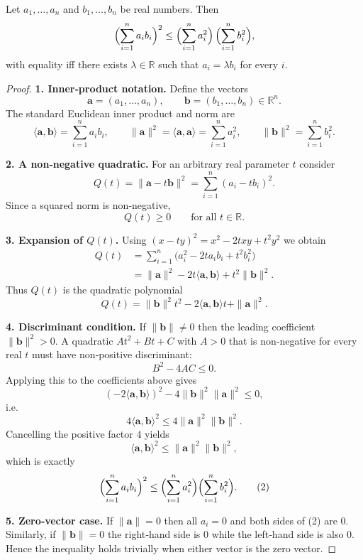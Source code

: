 \begin{theorem}
Let $a_{1},\dots ,a_{n}$ and $b_{1},\dots ,b_{n}$ be real numbers. Then
\[
\Bigl(\sum_{i=1}^{n} a_i b_i\Bigr)^{2}\le
\Bigl(\sum_{i=1}^{n} a_i^{2}\Bigr)\,
\Bigl(\sum_{i=1}^{n} b_i^{2}\Bigr),
\]
with equality iff there exists $\lambda\in\mathbb R$ such that $a_i=\lambda b_i$ for every $i$.
\end{theorem}

\begin{proof}
\textbf{1. Inner‑product notation.}  
Define the vectors
\[
\mathbf a=(a_{1},\dots ,a_{n}),\qquad 
\mathbf b=(b_{1},\dots ,b_{n})\in\mathbb R^{n}.
\]
The standard Euclidean inner product and norm are
\[
\langle\mathbf a,\mathbf b\rangle =\sum_{i=1}^{n}a_i b_i,\qquad
\|\mathbf a\|^{2}= \langle\mathbf a,\mathbf a\rangle =\sum_{i=1}^{n}a_i^{2},\qquad
\|\mathbf b\|^{2}= \sum_{i=1}^{n}b_i^{2}.
\]

\textbf{2. A non‑negative quadratic.}  
For an arbitrary real parameter $t$ consider
\[
Q(t)=\|\mathbf a-t\mathbf b\|^{2}= \sum_{i=1}^{n}(a_i-t b_i)^{2}.
\]
Since a squared norm is non‑negative,
\[
Q(t)\ge 0\qquad\text{for all }t\in\mathbb R. \tag{1}
\]

\textbf{3. Expansion of $Q(t)$.}  
Using $(x-ty)^{2}=x^{2}-2txy+t^{2}y^{2}$ we obtain
\begin{align*}
Q(t)
&=\sum_{i=1}^{n}\bigl(a_i^{2}-2t a_i b_i+t^{2}b_i^{2}\bigr)\\
&=\|\mathbf a\|^{2}-2t\langle\mathbf a,\mathbf b\rangle+t^{2}\|\mathbf b\|^{2}.
\end{align*}
Thus $Q(t)$ is the quadratic polynomial
\[
Q(t)=\|\mathbf b\|^{2}t^{2}-2\langle\mathbf a,\mathbf b\rangle t+\|\mathbf a\|^{2}.
\]

\textbf{4. Discriminant condition.}  
If $\|\mathbf b\|\neq0$ then the leading coefficient $\|\mathbf b\|^{2}>0$.  
A quadratic $At^{2}+Bt+C$ with $A>0$ that is non‑negative for every real $t$ must have non‑positive discriminant:
\[
B^{2}-4AC\le0.
\]
Applying this to the coefficients above gives
\[
(-2\langle\mathbf a,\mathbf b\rangle)^{2}
-4\|\mathbf b\|^{2}\|\mathbf a\|^{2}\le0,
\]
i.e.
\[
4\langle\mathbf a,\mathbf b\rangle^{2}\le4\|\mathbf a\|^{2}\|\mathbf b\|^{2}.
\]
Cancelling the positive factor $4$ yields
\[
\langle\mathbf a,\mathbf b\rangle^{2}\le\|\mathbf a\|^{2}\|\mathbf b\|^{2},
\]
which is exactly
\[
\Bigl(\sum_{i=1}^{n}a_i b_i\Bigr)^{2}
\le
\Bigl(\sum_{i=1}^{n}a_i^{2}\Bigr)
\Bigl(\sum_{i=1}^{n}b_i^{2}\Bigr). \tag{2}
\]

\textbf{5. Zero‑vector case.}  
If $\|\mathbf a\|=0$ then all $a_i=0$ and both sides of (2) are $0$.  
Similarly, if $\|\mathbf b\|=0$ the right‑hand side is $0$ while the left‑hand side is also $0$.  
Hence the inequality holds trivially when either vector is the zero vector.


\end{proof}
